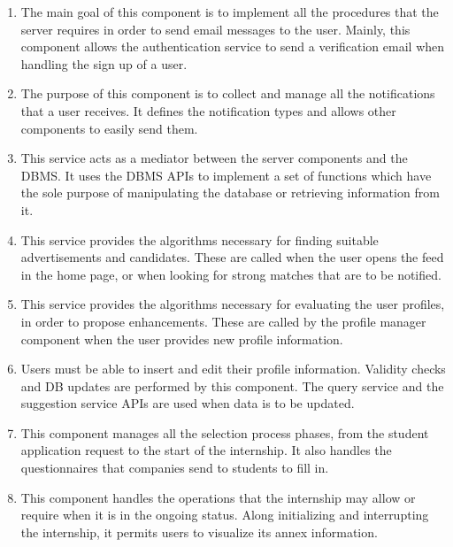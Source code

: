 \begin{enumerate}[label=\textbf{C\arabic* -}]
\item {}
The main goal of this component is to implement all the procedures that the server requires in order to send email messages to the user.
Mainly, this component allows the authentication service to send a verification email when handling the sign up of a user.

\item {}
The purpose of this component is to collect and manage all the notifications that a user receives.
It defines the notification types and allows other components to easily send them.

\item {}
This service acts as a mediator between the server components and the DBMS.
It uses the DBMS APIs to implement a set of functions which have the sole purpose of manipulating the database or retrieving information from it.

\item {}
This service provides the algorithms necessary for finding suitable advertisements and candidates.
These are called when the user opens the feed in the home page, or when looking for strong matches that are to be notified.

\item {}
This service provides the algorithms necessary for evaluating the user profiles, in order to propose enhancements.
These are called by the profile manager component when the user provides new profile information.

\item {}
Users must be able to insert and edit their profile information.
Validity checks and DB updates are performed by this component.
The query service and the suggestion service APIs are used when data is to be updated.

\item {}
This component manages all the selection process phases, from the student application request to the start of the internship.
It also handles the questionnaires that companies send to students to fill in.

\item {}
This component handles the operations that the internship may allow or require when it is in the ongoing status.
Along initializing and interrupting the internship, it permits users to visualize its annex information.


\end{enumerate}
